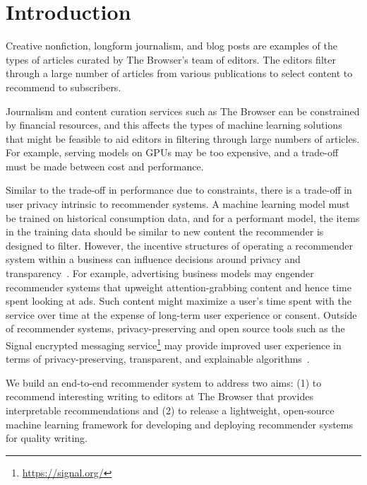 \section{Introduction}
\label{sec:introduction}
Creative nonfiction, longform journalism, and blog posts are examples of the types of articles curated by The Browser's team of editors. The editors filter through a large number of articles from various publications to select content to recommend to subscribers.

Journalism and content curation services such as The Browser can be constrained by financial resources, and this affects the types of machine learning solutions that might be feasible to aid editors in filtering through large numbers of articles. For example, serving models on GPUs may be too expensive, and a trade-off must be made between cost and performance.

Similar to the trade-off in performance due to constraints, there is a trade-off in user privacy intrinsic to recommender systems. A machine learning model must be trained on historical consumption data, and for a performant model, the items in the training data should be similar to new content the recommender is designed to filter. However, the incentive structures of operating a recommender system within a business can influence decisions around privacy and transparency~\citep{diakopoulos2020oxford}. For example, advertising business models may engender recommender systems that upweight attention-grabbing content and hence time spent looking at ads. Such content might maximize a user's time spent with the service over time at the expense of long-term user experience or consent. Outside of recommender systems, privacy-preserving and open source tools such as the Signal encrypted messaging service\footnote{\url{https://signal.org/}} may provide improved user experience in terms of privacy-preserving, transparent, and explainable algorithms~\citep{cohn-gordon2017a-formal}.

We build an end-to-end recommender system to address two aims: (1) to recommend interesting writing to editors at The Browser that provides interpretable recommendations and (2) to release a lightweight, open-source machine learning framework for developing and deploying recommender systems for quality writing.